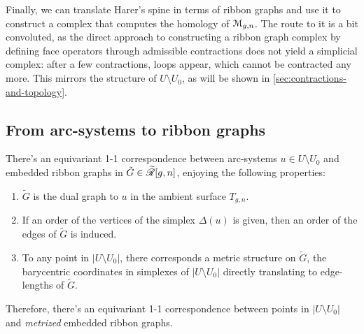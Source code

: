 Finally, we can translate Harer's spine in terms of ribbon graphs and
use it to construct a complex that computes the homology of
$\mathcal{M}_{g,n}$.  The route to it is a bit convoluted, as the direct
approach to constructing a ribbon graph complex by defining face
operators through admissible contractions does not yield a simplicial
complex: after a few contractions, loops appear, which cannot be
contracted any more.  This mirrors the structure of $U \setminus U_0$, as will
be shown in \ref{sec:contractions-and-topology}.


\subsection{From arc-systems to ribbon graphs}
\label{sec:arcs-to-rg}

\begin{lemma}
  \label{lemma:arcs-to-rg}
  There's an equivariant 1-1 correspondence between arc-systems $u \in U
  \setminus U_0$ and embedded ribbon graphs in ${\tilde G} \in \mathscr{\widetilde R}[g,n]$,
  enjoying the following properties:
  \begin{enumerate}
  \item ${\tilde G}$ is the dual graph to $u$ in the ambient surface
    $T_{g,n}$.
  \item If an order of the vertices of the simplex $\Delta(u)$ is given,
    then an order of the edges of ${\tilde G}$ is induced.
  \item To any point in $|U \setminus U_0|$, there corresponds a
    metric structure on ${\tilde G}$, the barycentric coordinates
    in simplexes of $|U \setminus U_0|$ directly translating to edge-lengths
    of ${\tilde G}$.
  \end{enumerate}
  Therefore, there's an equivariant 1-1 correspondence between points
  in $|U \setminus U_0|$ and \emph{metrized} embedded ribbon graphs.
\end{lemma}
